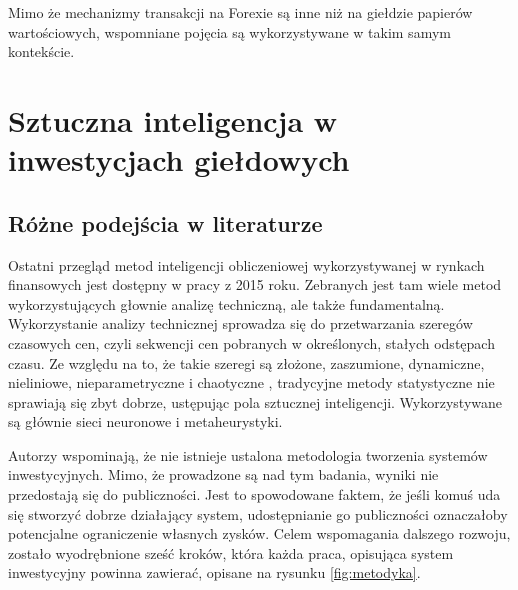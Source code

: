 \documentclass[twoside]{iisthesis}
\begin{document}
Mimo że mechanizmy transakcji na Forexie są inne niż na giełdzie papierów wartościowych, wspomniane pojęcia są wykorzystywane w takim samym kontekście.

\chapter{Sztuczna inteligencja w inwestycjach giełdowych}

\section{Różne podejścia w literaturze}
Ostatni przegląd metod inteligencji obliczeniowej wykorzystywanej w rynkach finansowych jest dostępny w pracy \cite{Cavalcante2016194} z 2015 roku. Zebranych jest tam wiele metod wykorzystujących głownie analizę techniczną, ale także fundamentalną. Wykorzystanie analizy technicznej sprowadza się do przetwarzania szeregów czasowych cen, czyli sekwencji cen pobranych w określonych, stałych odstępach czasu. Ze względu na to, że takie szeregi są złożone, zaszumione, dynamiczne, nieliniowe, nieparametryczne i chaotyczne \cite{Si20132581}, tradycyjne metody statystyczne nie sprawiają się zbyt dobrze, ustępując pola sztucznej inteligencji. Wykorzystywane są głównie sieci neuronowe i metaheurystyki.

Autorzy wspominają, że nie istnieje ustalona metodologia tworzenia systemów inwestycyjnych. Mimo, że prowadzone są nad tym badania, wyniki nie przedostają się do publiczności. Jest to spowodowane faktem, że jeśli komuś uda się stworzyć dobrze działający system, udostępnianie go publiczności oznaczałoby potencjalne ograniczenie własnych zysków. Celem wspomagania dalszego rozwoju, zostało wyodrębnione sześć kroków, która każda praca, opisująca system inwestycyjny powinna zawierać, opisane na rysunku \ref{fig:metodyka}.
\end{document}
